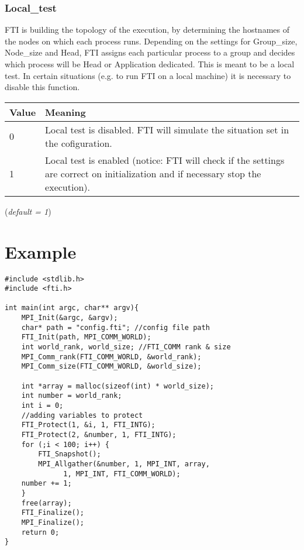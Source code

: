 \documentclass{refrep}
\begin{document}
\subsection{Local\_test}\label{subsec:localtest}
FTI is building the topology of the execution, by determining the hostnames of the nodes on which each process runs. Depending on the settings for Group\_size, Node\_size and Head, FTI assigns each particular process to a group and decides which process will be Head or Application dedicated. This is meant to be a local test. In certain situations (e.g. to run FTI on a local machine) it is necessary to disable this function.
\begin{center}
\begin{tabular}[h!]{|p{}|p{}|}
\hline
\textbf{Value} & \textbf{Meaning} \\ \hline
0 & Local test is disabled. FTI will simulate the situation set in the cofiguration. \\ \hline
1 & Local test is enabled (notice: FTI will check if the settings are correct on initialization and if necessary stop the execution). \\ \hline
\end{tabular}
\end{center}
(\textit{default = 1})
\newpage
\chapter{Example}\label{ch:example}
\begin{center}
\begin{lstlisting}[frame=single]
#include <stdlib.h>
#include <fti.h>

int main(int argc, char** argv){
    MPI_Init(&argc, &argv);
    char* path = "config.fti"; //config file path
    FTI_Init(path, MPI_COMM_WORLD); 
    int world_rank, world_size; //FTI_COMM rank & size
    MPI_Comm_rank(FTI_COMM_WORLD, &world_rank);
    MPI_Comm_size(FTI_COMM_WORLD, &world_size);

    int *array = malloc(sizeof(int) * world_size);
    int number = world_rank;
    int i = 0;
    //adding variables to protect
    FTI_Protect(1, &i, 1, FTI_INTG);
    FTI_Protect(2, &number, 1, FTI_INTG);
    for (;i < 100; i++) {
        FTI_Snapshot();
        MPI_Allgather(&number, 1, MPI_INT, array, 
		      1, MPI_INT, FTI_COMM_WORLD);
	number += 1;
    }
    free(array);
    FTI_Finalize();
    MPI_Finalize();
    return 0;
}
\end{lstlisting}
\end{center}
\end{document}
